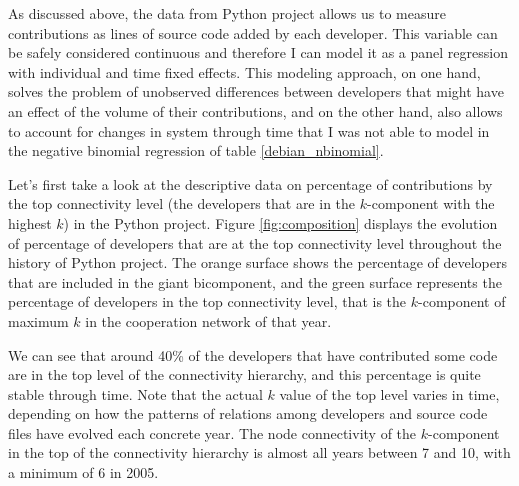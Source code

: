 As discussed above, the data from Python project allows us to measure contributions as lines of source code added by each developer. This variable can be safely considered continuous and therefore I can model it as a panel regression with individual and time fixed effects. This modeling approach, on one hand, solves the problem of unobserved differences between developers that might have an effect of the volume of their contributions, and on the other hand, also allows to account for changes in system through time that I was not able to model in the negative binomial regression of table \ref{debian_nbinomial}.
 
Let's first take a look at the descriptive data on percentage of contributions by the top connectivity level (the developers that are in the $k$-component with the highest $k$) in the Python project. Figure \ref{fig:composition} displays the evolution of percentage of developers that are at the top connectivity level throughout the history of Python project. The orange surface shows the percentage of developers that are included in the giant bicomponent, and the green surface represents the percentage of developers in the top connectivity level, that is the $k$-component of maximum $k$ in the cooperation network of that year.

We can see that around 40\% of the developers that have contributed some code are in the top level of the connectivity hierarchy, and this percentage is quite stable through time. Note that the actual $k$ value of the top level varies in time, depending on how the patterns of relations among developers and source code files have evolved each concrete year. The node connectivity of the $k$-component in the top of the connectivity hierarchy is almost all years between 7 and 10, with a minimum of 6 in 2005.

